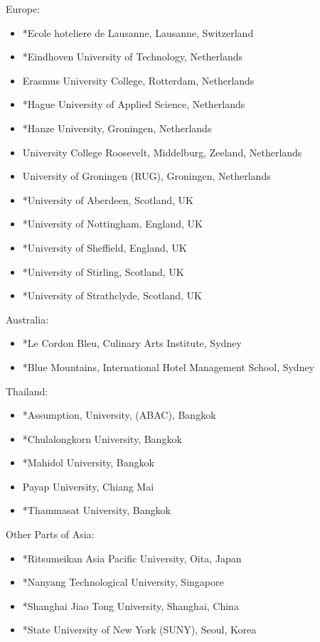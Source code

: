 Europe:

\begin{itemize}
\item *Ecole hoteliere de Lausanne, Lausanne, Switzerland
\item *Eindhoven University of Technology, Netherlands
\item Erasmus University College, Rotterdam, Netherlands
\item *Hague University of Applied Science, Netherlands
\item *Hanze University, Groningen, Netherlands
\item University College Roosevelt, Middelburg, Zeeland, Netherlands
\item University of Groningen (RUG), Groningen, Netherlands
\item *University of Aberdeen, Scotland, UK
\item *University of Nottingham, England, UK
\item *University of Sheffield, England, UK
\item *University of Stirling, Scotland, UK
\item *University of Strathclyde, Scotland, UK
\end{itemize}

Australia:

\begin{itemize}
\item *Le Cordon Bleu, Culinary Arts Institute, Sydney
\item *Blue Mountains, International Hotel Management School, Sydney
\end{itemize}


Thailand:

\begin{itemize}
\item *Assumption, University, (ABAC), Bangkok
\item *Chulalongkorn University, Bangkok
\item *Mahidol University, Bangkok
\item Payap University, Chiang Mai
\item *Thammasat University, Bangkok
\end{itemize}


Other Parts of Asia:

\begin{itemize}
\item *Ritsumeikan Asia Pacific University, Oita, Japan
\item *Nanyang Technological University, Singapore
\item *Shanghai Jiao Tong University, Shanghai, China
\item *State University of New York (SUNY), Seoul, Korea
\end{itemize}



